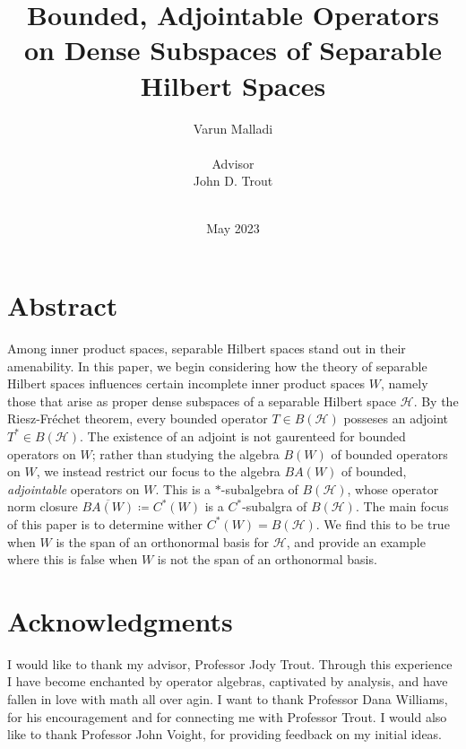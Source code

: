 \documentclass{dcthesis}
\title{Bounded, Adjointable Operators on Dense Subspaces of Separable Hilbert Spaces \vspace{0.5in}}
\author{Varun Malladi \\ \ \\ Advisor \\ John D. Trout \\ \ }
\date{May 2023}
\numberwithin{equation}{section}
\numberwithin{equation}{section}
\theoremstyle{definition}
\begin{document}
\frontmatter

\maketitle
\restoregeometry

\chapter*{Abstract}

Among inner product spaces, separable Hilbert spaces stand out in their amenability. In this paper, we begin considering how the theory of separable Hilbert spaces influences certain incomplete inner product spaces $W$, namely those that arise as proper dense subspaces of a separable Hilbert space $\mathcal{H}$. By the Riesz-Fr\'echet theorem, every bounded operator $T\in B(\mathcal{H})$ posseses an adjoint $T^\ast\in B(\mathcal{H})$. The existence of an adjoint is not gaurenteed for bounded operators on $W$; rather than studying the algebra $B(W)$ of bounded operators on $W$, we instead restrict our focus to the algebra $BA(W)$ of bounded, \textit{adjointable} operators on $W$. This is a $\ast$-subalgebra of $B(\mathcal{H})$, whose operator norm closure $\overline{BA(W)}\coloneqq C^\ast(W)$ is a $C^\ast$-subalgra of $B(\mathcal{H})$. The main focus of this paper is to determine wither $C^\ast(W)=B(\mathcal{H})$. We find this to be true when $W$ is the span of an orthonormal basis for $\mathcal{H}$, and provide an example where this is false when $W$ is not the span of an orthonormal basis.

\chapter*{Acknowledgments}


I would like to thank my advisor, Professor Jody Trout. Through this experience I have become enchanted by operator algebras, captivated by analysis, and have fallen in love with math all over agin. I want to thank Professor Dana Williams, for his encouragement and for connecting me with Professor Trout. I would also like to thank Professor John Voight, for providing feedback on my initial ideas.
\end{document}
